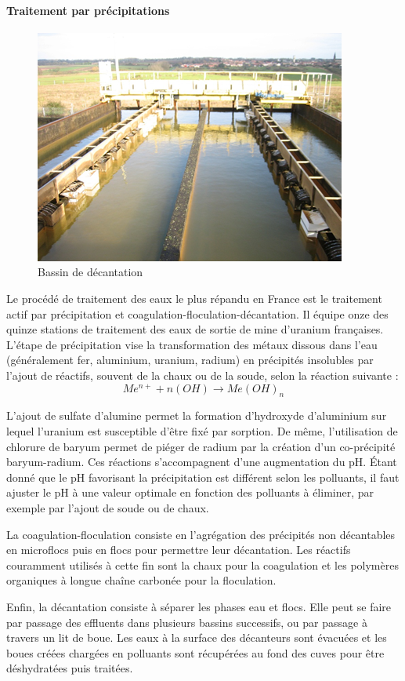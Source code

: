 \documentclass{article}
\begin{document}
\paragraph{Traitement par précipitations} \hspace{1 em}

\begin{figure}[H]
\centering
\includegraphics[width = 0.5\linewidth]{III_A_1.png}
\caption{Bassin de décantation}
\label{fig:bassin_decantation}
\end{figure}

Le procédé de traitement des eaux le plus répandu en France est le traitement actif par précipitation et coagulation-floculation-décantation. Il équipe onze des quinze stations de traitement des eaux de sortie de mine d'uranium françaises. 
L’étape de précipitation vise la transformation des métaux dissous dans l’eau (généralement fer, aluminium, uranium, radium) en précipités insolubles par l’ajout de réactifs, souvent de la chaux ou de la soude, selon la réaction suivante :   
$$Me^{n+} + n(OH) \rightarrow Me(OH)_{n}$$
          	
L’ajout de sulfate d’alumine permet la formation d’hydroxyde d’aluminium sur lequel l'uranium est susceptible d'être fixé par sorption. De même, l’utilisation de chlorure de baryum permet de piéger de radium par la création d’un co-précipité baryum-radium. Ces réactions s’accompagnent d’une augmentation du pH. Étant donné que le pH favorisant la précipitation est différent selon les polluants, il faut ajuster le pH à une valeur optimale en fonction des polluants à éliminer, par exemple par l’ajout de soude ou de chaux.  

La coagulation-floculation consiste en l’agrégation des précipités non décantables en microflocs puis en flocs  pour permettre leur décantation. Les réactifs couramment utilisés à cette fin sont la chaux pour la coagulation et les polymères organiques à longue chaîne carbonée pour la floculation. 

Enfin, la décantation consiste à séparer les phases eau et flocs. Elle peut se faire par passage des effluents dans plusieurs bassins successifs, ou par passage à travers un lit de boue. Les eaux à la surface des décanteurs sont évacuées et les boues créées chargées en polluants sont récupérées au fond des cuves pour être déshydratées puis traitées.
\end{document}
